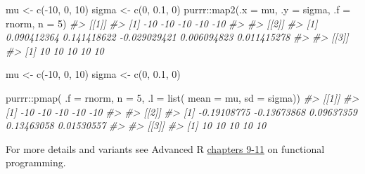 \documentclass[
  12pt,
]{book}
\newenvironment{Shaded}{\begin{snugshade}}{\end{snugshade}}
\newcommand{\AttributeTok}[1]{\textcolor[rgb]{0.77,0.63,0.00}{#1}}
\newcommand{\CommentTok}[1]{\textcolor[rgb]{0.56,0.35,0.01}{\textit{#1}}}
\newcommand{\DecValTok}[1]{\textcolor[rgb]{0.00,0.00,0.81}{#1}}
\newcommand{\FloatTok}[1]{\textcolor[rgb]{0.00,0.00,0.81}{#1}}
\newcommand{\FunctionTok}[1]{\textcolor[rgb]{0.00,0.00,0.00}{#1}}
\newcommand{\NormalTok}[1]{#1}
\newcommand{\OtherTok}[1]{\textcolor[rgb]{0.56,0.35,0.01}{#1}}
\newcommand{\SpecialCharTok}[1]{\textcolor[rgb]{0.00,0.00,0.00}{#1}}
\begin{document}
\begin{Shaded}
\begin{Highlighting}[]
\NormalTok{mu }\OtherTok{\textless{}{-}} \FunctionTok{c}\NormalTok{(}\SpecialCharTok{{-}}\DecValTok{10}\NormalTok{, }\DecValTok{0}\NormalTok{, }\DecValTok{10}\NormalTok{)}
\NormalTok{sigma }\OtherTok{\textless{}{-}} \FunctionTok{c}\NormalTok{(}\DecValTok{0}\NormalTok{, }\FloatTok{0.1}\NormalTok{, }\DecValTok{0}\NormalTok{)}
\NormalTok{purrr}\SpecialCharTok{::}\FunctionTok{map2}\NormalTok{(}\AttributeTok{.x =}\NormalTok{ mu, }\AttributeTok{.y =}\NormalTok{ sigma, }\AttributeTok{.f =}\NormalTok{ rnorm, }\AttributeTok{n =} \DecValTok{5}\NormalTok{)}
\CommentTok{\#\textgreater{} [[1]]}
\CommentTok{\#\textgreater{} [1] {-}10 {-}10 {-}10 {-}10 {-}10}
\CommentTok{\#\textgreater{} }
\CommentTok{\#\textgreater{} [[2]]}
\CommentTok{\#\textgreater{} [1]  0.090412364  0.141418622 {-}0.029029421  0.006094823  0.011415278}
\CommentTok{\#\textgreater{} }
\CommentTok{\#\textgreater{} [[3]]}
\CommentTok{\#\textgreater{} [1] 10 10 10 10 10}
\end{Highlighting}
\end{Shaded}

\begin{Shaded}
\begin{Highlighting}[]
\NormalTok{mu }\OtherTok{\textless{}{-}} \FunctionTok{c}\NormalTok{(}\SpecialCharTok{{-}}\DecValTok{10}\NormalTok{, }\DecValTok{0}\NormalTok{, }\DecValTok{10}\NormalTok{)}
\NormalTok{sigma }\OtherTok{\textless{}{-}} \FunctionTok{c}\NormalTok{(}\DecValTok{0}\NormalTok{, }\FloatTok{0.1}\NormalTok{, }\DecValTok{0}\NormalTok{)}

\NormalTok{purrr}\SpecialCharTok{::}\FunctionTok{pmap}\NormalTok{(}
  \AttributeTok{.f =}\NormalTok{ rnorm, }
  \AttributeTok{n =} \DecValTok{5}\NormalTok{,}
  \AttributeTok{.l =} \FunctionTok{list}\NormalTok{(}
    \AttributeTok{mean =}\NormalTok{ mu, }
    \AttributeTok{sd =}\NormalTok{ sigma))}
\CommentTok{\#\textgreater{} [[1]]}
\CommentTok{\#\textgreater{} [1] {-}10 {-}10 {-}10 {-}10 {-}10}
\CommentTok{\#\textgreater{} }
\CommentTok{\#\textgreater{} [[2]]}
\CommentTok{\#\textgreater{} [1] {-}0.19108775 {-}0.13673868  0.09637359  0.13463058  0.01530557}
\CommentTok{\#\textgreater{} }
\CommentTok{\#\textgreater{} [[3]]}
\CommentTok{\#\textgreater{} [1] 10 10 10 10 10}
\end{Highlighting}
\end{Shaded}

For more details and variants see Advanced R \href{https://adv-r.hadley.nz/functionals.html}{chapters 9-11} on functional programming.
\end{document}
